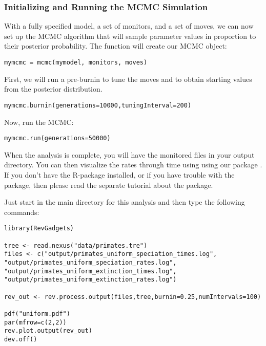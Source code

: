 \subsubsection{Initializing and Running the MCMC Simulation}

With a fully specified model, a set of monitors, and a set of moves, we can now set up the MCMC algorithm that will sample parameter values in proportion to their posterior probability. The  function will create our MCMC object:
{\tt \begin{snugshade*}
\begin{lstlisting}
mymcmc = mcmc(mymodel, monitors, moves)
\end{lstlisting}
\end{snugshade*}}

First, we will run a pre-burnin to tune the moves and to obtain starting values from the posterior distribution.
{\tt \begin{snugshade*}
\begin{lstlisting}
mymcmc.burnin(generations=10000,tuningInterval=200)
\end{lstlisting}
\end{snugshade*}}


Now, run the MCMC:
{\tt \begin{snugshade*}
\begin{lstlisting}
mymcmc.run(generations=50000)
\end{lstlisting}
\end{snugshade*}}

When the analysis is complete, you will have the monitored files in your output directory.
You can then visualize the rates through time using \R using our package \RevGadgets.
If you don't have the R-package \RevGadgets installed, or if you have trouble with the package, then please read the separate tutorial about the package.

Just start \R in the main directory for this analysis and then type the following commands:
{\tt \begin{snugshade*}
\begin{lstlisting}
library(RevGadgets)

tree <- read.nexus("data/primates.tre")
files <- c("output/primates_uniform_speciation_times.log", "output/primates_uniform_speciation_rates.log", "output/primates_uniform_extinction_times.log", "output/primates_uniform_extinction_rates.log")

rev_out <- rev.process.output(files,tree,burnin=0.25,numIntervals=100)

pdf("uniform.pdf")
par(mfrow=c(2,2))
rev.plot.output(rev_out)
dev.off()
\end{lstlisting}
\end{snugshade*}}

